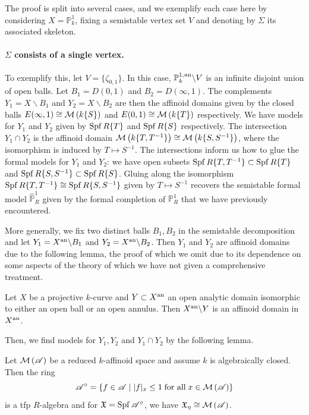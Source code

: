 The proof is split into several cases, and we exemplify each case here by considering $X = \mathbb{P}^{1}_{k}$, fixing a semistable vertex set $V$ and denoting by $\Sigma$ its associated skeleton.

\paragraph{$\Sigma$ consists of a single vertex.}

To exemplify this, let $V = \{ \zeta_{0, 1} \}$.
In this case, $\mathbb{P}^{1, \text{an}}_{k} \backslash V$ is an infinite disjoint union of open balls.
Let $B_1 = D(0, 1)$ and $B_2 = D(\infty, 1)$.
The complements $Y_1 = X \backslash B_1$ and $Y_2 = X \backslash B_2$ are then the affinoid domains given by the closed balls $E(\infty, 1) \cong \mathcal{M}\left(k\{S\}\right)$ and $E(0, 1) \cong \mathcal{M}\left(k\{T\}\right)$ respectively.
We have models for $Y_1$ and $Y_2$ given by $\operatorname{Spf} R\{T\}$ and $\operatorname{Spf} R\{S\}$ respectively.
The intersection $Y_1 \cap Y_2$ is the affinoid domain $\mathcal{M}\left(k\{T, T^{-1}\}\right) \cong \mathcal{M}\left(k\{S, S^{-1}\}\right)$, where the isomorphism is induced by $T \mapsto S^{-1}$.
The intersections inform us how to glue the formal models for $Y_1$ and $Y_2$: we have open subsets $\operatorname{Spf} R\{T, T^{-1}\} \subset \operatorname{Spf} R\{T\}$ and $\operatorname{Spf} R\{S, S^{-1}\} \subset \operatorname{Spf} R\{S\}$.
Gluing along the isomorphism $\operatorname{Spf} R\{T, T^{-1}\} \cong \operatorname{Spf} R\{S, S^{-1}\}$ given by $T \mapsto S^{-1}$ recovers the semistable formal model $\hat{\mathbb{P}}^{1}_{R}$ given by the formal completion of $\mathbb{P}^{1}_{R}$ that we have previously encountered.

More generally, we fix two distinct balls $B_1, B_2$ in the semistable decomposition and let $Y_1 = X^{\text{an}} \backslash B_1$ and $Y_2 = X^{\text{an}} \backslash B_2$.
Then $Y_1$ and $Y_2$ are affinoid domains due to the following lemma, the proof of which we omit due to its dependence on some aspects of the theory of which we have not given a comprehensive treatment.

\begin{lemma} \label{complementaffinoid} \parencite[Lemma 4.12]{bpr}
    Let $X$ be a projective $k$-curve and $Y \subset X^{\text{an}}$ an open analytic domain isomorphic to either an open ball or an open annulus.
    Then $X^{\text{an}} \backslash Y$ is an affinoid domain in $X^{\text{an}}$.
\end{lemma}

Then, we find models for $Y_1, Y_2$ and $Y_1 \cap Y_2$ by the following lemma.

\begin{lemma} \label{canonicalmodel} \parencite[Proposition 1.1]{boschlutkebohmert}
    Let $\mathcal{M}\left(\mathscr{A}\right)$ be a reduced $k$-affinoid space and assume $k$ is algebraically closed.
    Then the ring
    \[\mathscr{A}^{\circ} = \{ f \in \mathscr{A} \; \vert \; |f|_x \leq 1 \; \text{for all} \; x \in \mathcal{M}\left(\mathscr{A}\right) \}\]
    is a tfp $R$-algebra and for $\mathfrak{X} = \operatorname{Spf} \mathscr{A}^{\circ}$, we have $\mathfrak{X}_{\eta} \cong \mathcal{M}\left(\mathscr{A}\right)$.
\end{lemma}

